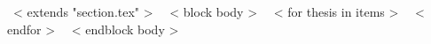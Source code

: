 \vspace{5mm}
~< extends "section.tex" >~
~< block body >~
~< for thesis in items >~
\hspace{1em} 
\hspace{1em} 
~< endfor >~
~< endblock body >~
